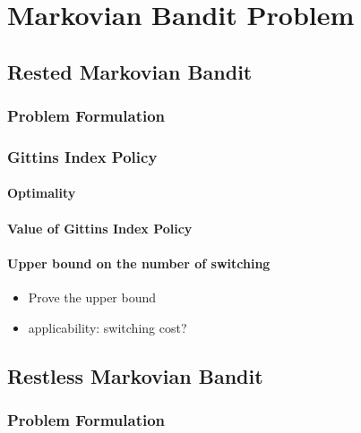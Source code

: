 \chapter{Markovian Bandit Problem}
\label{ch:mab_problem}

\section{Rested Markovian Bandit}
\label{sec:rested_mab_pb}

\subsection{Problem Formulation}
\label{subsec:rested_pb_formul}

\subsection{Gittins Index Policy}
\label{subsec:gittins_idx}

\subsubsection{Optimality}

\subsubsection{Value of Gittins Index Policy}

\subsubsection{Upper bound on the number of switching}

\begin{itemize}
    \item Prove the upper bound
    \item applicability: switching cost?
\end{itemize}

\section{Restless Markovian Bandit}
\label{sec:restless_mab_pb}

\subsection{Problem Formulation}
\label{subsec:restless_pb_formul}

